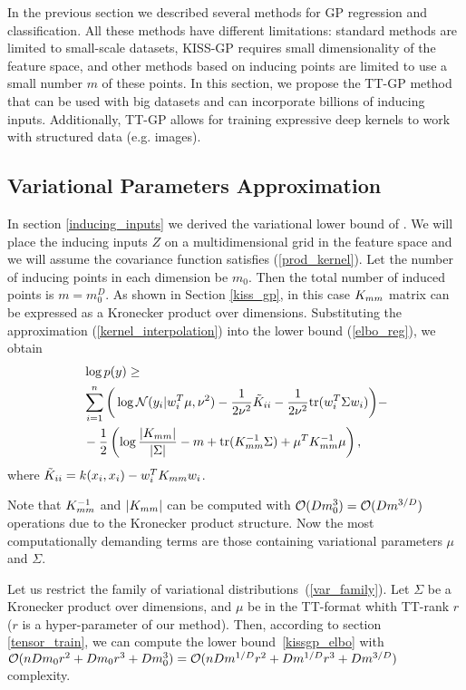 In the previous section we described several methods for GP regression and
classification. All these methods have different limitations: standard methods
are limited to small-scale datasets, KISS-GP requires small dimensionality of
the feature space, and other methods based on inducing points are limited to use
a small number $m$ of these points. In this section, we propose the TT-GP method
that can be used with big datasets and can incorporate billions of inducing
inputs. Additionally, TT-GP allows for training expressive deep kernels to work
with structured data (e.g. images).

\subsection{Variational Parameters Approximation}
  In section \ref{inducing_inputs} we derived the variational lower bound of
  \citet{hensman2013}. We will place the inducing inputs $Z$ on a
  multidimensional grid in the feature space and we will assume the
  covariance function satisfies (\ref{prod_kernel}). Let the number
  of inducing points in each dimension be $m_0$. Then the total number of induced points is $m = m_0^D$.
  As shown in Section \ref{kiss_gp},
  in this case $K_{mm}$ matrix can be expressed as a Kronecker product over
  dimensions. Substituting the approximation (\ref{kernel_interpolation}) into
  the lower bound (\ref{elbo_reg}), we obtain
  \begin{equation}
  \label{kissgp_elbo}
    \begin{split}
      &\log p(y) \ge
        \\
        &\sum_{i=1}^n \bigg ( \log \mathcal{N} (y_i | w_i^T \mu, \nu^2) -
        \frac 1 {2\nu^2} \tilde K_{ii} - 
        \frac 1 {2\nu^2} \mbox{tr} (w_i^T \Sigma w_i)
      \bigg )-
      \\
      &- \frac 1 2 \left(
        \log \frac {|K_{mm}|} {|\Sigma|} - m + \mbox{tr}(K_{mm}^{-1} \Sigma) +
        \mu^T K_{mm}^{-1} \mu
      \right),
    \end{split}
  \end{equation}
  where $\tilde K_{ii} = k(x_i, x_i) - w_i^T K_{mm} w_i$.

  Note that $K_{mm}^{-1}$ and $|K_{mm}|$ can be computed with
  $\mathcal{O}(D m_0^3) = \mathcal{O}(D m^{3/D})$ operations due to the
  Kronecker product structure. Now the most computationally demanding terms
  are those containing variational parameters $\mu$ and $\Sigma$.

  Let us restrict the family of variational distributions~(\ref{var_family}). Let $\Sigma$ be
  a Kronecker product over dimensions, and $\mu$ be in the TT-format whith 
  TT-rank $r$ ($r$ is a hyper-parameter of our method). Then, according to 
  section \ref{tensor_train}, we can compute the lower bound~\eqref{kissgp_elbo}
  with
  $\mathcal{O}(nDm_0 r^2 + D m_0 r^3 + Dm_0^3) =
  \mathcal{O}(nD m^{1/D} r^2 + D m^{1/D} r^3 + D m^{3/D})$ complexity.

